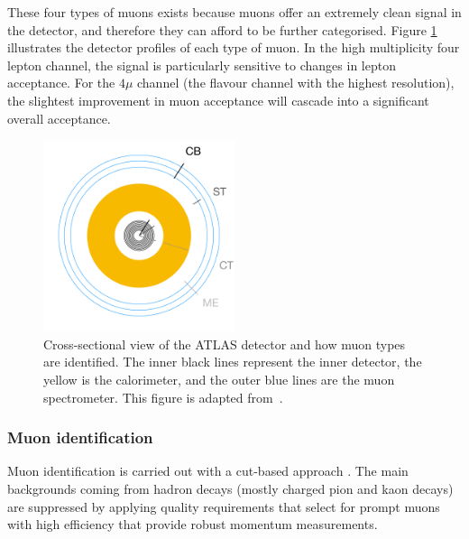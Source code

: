 These four types of muons exists because muons offer an extremely clean signal in the detector, and therefore they can afford to be further categorised. Figure \ref{fig:typesofmuons} illustrates the detector profiles of each type of muon. In the high multiplicity four lepton channel, the signal is particularly sensitive to changes in lepton acceptance. For the $4\mu$ channel (the flavour channel with the highest resolution), the slightest improvement in muon acceptance will cascade into a significant overall acceptance. 
\begin{figure}
    \centering
    \includegraphics[width=0.5\textwidth]{Figures/LHC/muon_types.pdf}
    \caption{Cross-sectional view of the ATLAS detector and how muon types are identified. The inner black lines represent the inner detector, the yellow is the calorimeter, and the outer blue lines are the muon spectrometer. This figure is adapted from~\cite{Ottersbach:2012mma}.}
    \label{fig:typesofmuons}
\end{figure}
\subsubsection{Muon identification}

Muon identification is carried out with a cut-based approach \cite{}. The main backgrounds coming from hadron decays (mostly charged pion and kaon decays) are suppressed by applying quality requirements that select for prompt muons with high efficiency that provide robust momentum measurements. 

